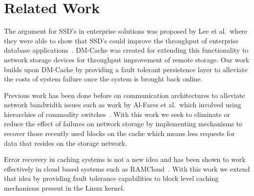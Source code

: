 \section{Related Work}
\label{sec:related}

The argument for SSD's in enterprise solutions was proposed by Lee et
al.\ where they were able to show that SSD's could improve the
throughput of enterprise database
applications~\cite{EnterpriseSSD}. DM-Cache was created for extending
this functionality to network storage devices for throughput
improvement of remote storage. Our work builds upon DM-Cache by
providing a fault tolerant persistence layer to alleviate the costs of
system failure once the system is brought back online.

Previous work has been done before on communication architectures to
alleviate network bandwidth issues such as work by Al-Fares et al.\
which involved using hierarchies of commodity
switches~\cite{Network}. With this work we seek to eliminate or reduce
the effect of failures on network storage by implementing mechanisms
to recover those recently used blocks on the cache which means less
requests for data that resides on the storage network.

Error recovery in caching systems is not a new idea and has been shown
to work effectively in cloud based systems such as
RAMCloud~\cite{RAMCloud}. With this work we extend that idea by
providing fault tolerance capabilities to block level caching
mechanisms present in the Linux kernel.
